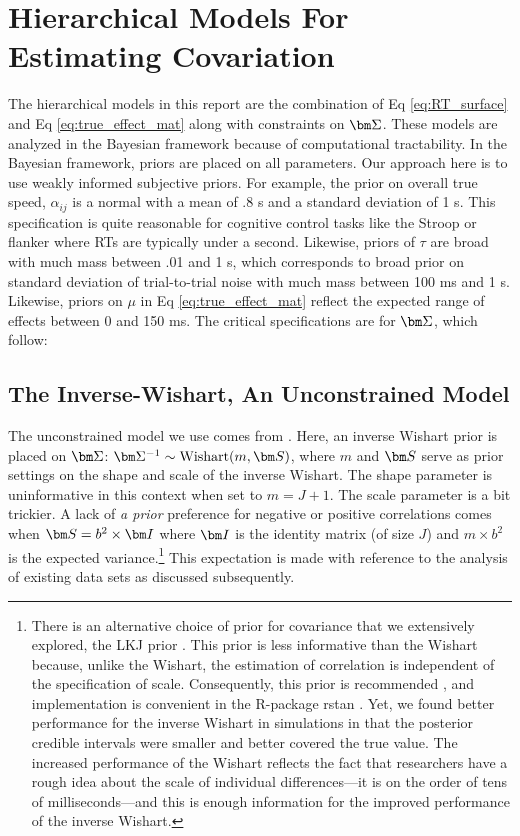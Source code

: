 \documentclass[man, 12pt]{apa7} %
\begin{document}
\section{Hierarchical Models For Estimating Covariation}

The hierarchical models in this report are the combination of Eq \ref{eq:RT_surface} and Eq \ref{eq:true_effect_mat} along with constraints on $\bfSigma$.  These models are analyzed in the Bayesian framework because of computational tractability.  In the Bayesian framework, priors are placed on all parameters.  Our approach here is to use weakly informed subjective priors.  For example, the prior on overall true speed, $\alpha_{ij}$ is a normal with a mean of .8 s and a standard deviation of 1 s.  This specification is quite reasonable for cognitive control tasks like the Stroop or flanker where RTs are typically under a second. Likewise, priors of $\tau$ are broad with much mass between .01 and 1 s, which corresponds to broad prior on standard deviation of trial-to-trial noise with much mass between 100 ms and 1 s.  Likewise, priors on $\mu$ in Eq \ref{eq:true_effect_mat} reflect the expected range of effects between 0 and 150 ms.  The critical specifications are for $\bfSigma$, which follow:


\subsection{The Inverse-Wishart, An Unconstrained Model}

The unconstrained model we use comes from \textcite{Rouder.etal.2023, Haaf.Rouder.2017}.  Here, an inverse Wishart prior is placed on $\bfSigma$: $\bfSigma^{-1} \sim \mbox{Wishart}(m,\bfS)$, where $m$ and $\bfS$ serve as prior settings on the shape and scale of the inverse Wishart.  The shape parameter is uninformative in this context when set to $m=J+1$.  The scale parameter is a bit trickier.  A lack of \textit{a prior} preference for negative or positive correlations comes when $\bfS=b^2\times\bfI$ where $\bfI$ is the identity matrix (of size $J$) and $m\times b^2$ is the expected variance.\footnote{There is an alternative choice of prior for covariance that we extensively explored, the LKJ prior \parencite{Lewandowski.etal.2009}. This prior is less informative than the Wishart because, unlike the Wishart, the estimation of correlation is independent of the specification of scale. Consequently, this prior is recommended \parencite[]{McElreath.2016}, and implementation is convenient in the R-package rstan \parencite[]{Stan_Development_Team2020-sz}. Yet, we found better performance for the inverse Wishart in simulations in that the posterior credible intervals were smaller and better covered the true value. The increased performance of the Wishart reflects the fact that researchers have a rough idea about the scale of individual differences—it is on the order of tens of milliseconds—and this is enough information for the improved performance of the inverse Wishart.}  This expectation is made with reference to the analysis of existing data sets as discussed subsequently.
\end{document}
